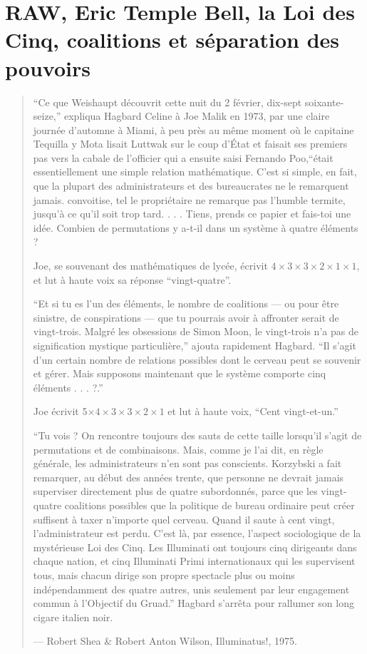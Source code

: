\chapter[Coalitions et séparation des pouvoirs]{RAW, Eric Temple Bell, la Loi des Cinq, coalitions et séparation des pouvoirs}

\blockquote{
\small{``Ce que Weishaupt découvrit cette nuit du 2 février, dix-sept soixante-seize,'' expliqua Hagbard Celine à Joe Malik en 1973, par une claire journée d'automne à Miami, à peu près au même moment où le capitaine Tequilla y Mota lisait Luttwak sur le coup d'État et faisait ses premiers pas vers la cabale de l'officier qui a ensuite saisi Fernando Poo,``était essentiellement une simple relation mathématique. C'est si simple, en fait, que la plupart des administrateurs et des bureaucrates ne le remarquent jamais. convoitise, tel le propriétaire ne remarque pas l'humble termite, jusqu'à ce qu'il soit trop tard. . . . Tiens, prends ce papier et fais-toi une idée. Combien de permutations y a-t-il dans un système à quatre éléments ?

Joe, se souvenant des mathématiques de lycée, écrivit $4\times3\times3\times2\times1\times1$, et lut à haute voix sa réponse ``vingt-quatre''.

``Et si tu es l'un des éléments, le nombre de coalitions --- ou pour être sinistre, de conspirations --- que tu pourrais avoir à affronter serait de vingt-trois. Malgré les obsessions de Simon Moon, le vingt-trois n'a pas de signification mystique particulière,'' ajouta rapidement Hagbard. ``Il s'agit d'un certain nombre de relations possibles dont le cerveau peut se souvenir et gérer. Mais supposons maintenant que le système comporte cinq éléments . . . ?.''

Joe écrivit 5$\times4\times3\times3\times2\times1$ et lut à haute voix, ``Cent vingt-et-un.''

``Tu vois ? On rencontre toujours des sauts de cette taille lorsqu'il s'agit de permutations et de combinaisons. Mais, comme je l'ai dit, en règle générale, les administrateurs n'en sont pas conscients. Korzybski a fait remarquer, au début des années trente, que personne ne devrait jamais superviser directement plus de quatre subordonnés, parce que les vingt-quatre coalitions possibles que la politique de bureau ordinaire peut créer suffisent à taxer n'importe quel cerveau. Quand il saute à cent vingt, l'administrateur est perdu. C'est là, par essence, l'aspect sociologique de la mystérieuse Loi des Cinq. Les Illuminati ont toujours cinq dirigeants dans chaque nation, et cinq Illuminati Primi internationaux qui les supervisent tous, mais chacun dirige son propre spectacle plus ou moins indépendamment des quatre autres, unis seulement par leur engagement commun à l'Objectif du Gruad.'' Hagbard s'arrêta pour rallumer son long cigare italien noir.}
\par\begin{flushright} \textup{--- Robert Shea \& Robert Anton Wilson}, Illuminatus!, 1975. \end{flushright}
}

